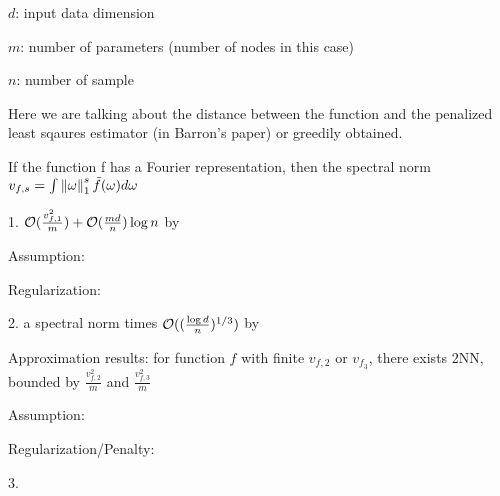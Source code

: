 \newpage
$d$: input data dimension

$m$: number of parameters (number of nodes in this case)

$n$: number of sample

Here we are talking about the distance between the function and the 
penalized least sqaures estimator (in Barron's paper) or greedily obtained.


If the function f has a Fourier representation, then the spectral norm
$v_{f, s} = \int \left\| \omega \right\|_1^s \tilde{f}(\omega) d\omega$

1. $\mathcal{O}(\frac{v_{f,1}^2}{m}) + \mathcal{O}(\frac{md}{n})\log{n}$ by \cite[Theorem 3/4]{barronApproximationEstimationBounds1994}

Assumption: 

Regularization:

2. a spectral norm times $\mathcal{O}((\frac{\log{d}}{n})^{1/3})$ by \cite[Theorem 1]{klusowskiRiskBoundsHighdimensional2018}

Approximation results: for function $f$ with finite $v_{f,2}$ or $v_{f_3}$, there exists 2NN, bounded by $\frac{v_{f,2}^2}{m}$ and $\frac{v_{f,3}^2}{m}$ 

Assumption: 

Regularization/Penalty:

3. 


